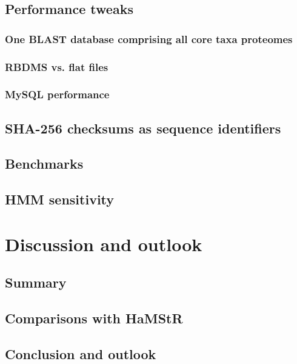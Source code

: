 \documentclass[a4paper,12.5pt]{scrreprt}
\newcommand{\hamstr}{HaMStR\xspace}
\begin{document}
	\section{Performance tweaks}
		\subsection{One BLAST database comprising all core taxa proteomes}
			
		\subsection{RBDMS vs. flat files}
		\subsection{MySQL performance}
	\section{SHA-256 checksums as sequence identifiers}
		
	\section{Benchmarks}
	\section{HMM sensitivity}
		

\chapter{Discussion and outlook}
	
	\section{Summary}
	\section{Comparisons with \hamstr}
	\clearpage
	\section{Conclusion and outlook}
	\clearpage

{}
%
%
\printbibliography
\clearpage
\end{document}
